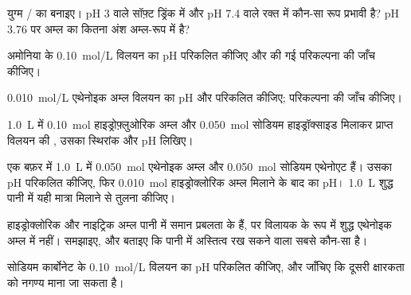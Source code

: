 \begin{exercise}[$\star$]\label{exo:b1:predominant-reaction:4}
युग्म / का  बनाइए।
pH 3 वाले सॉफ़्ट ड्रिंक में और pH 7.4 वाले रक्त में कौन-सा रूप प्रभावी है?
pH 3.76 पर अम्ल का कितना अंश अम्ल-रूप में है?
\end{exercise}

\begin{exercise}[$\star\star$]\label{exo:b1:predominant-reaction:5}
अमोनिया के \qty{0.10}{mol/L} विलयन का pH परिकलित कीजिए और की गई
परिकल्पना की जाँच कीजिए।
\end{exercise}

\begin{exercise}[$\star\star$]\label{exo:b1:predominant-reaction:6}
\qty{0.010}{mol/L} एथेनोइक अम्ल विलयन का pH और
 परिकलित कीजिए; परिकल्पना की जाँच कीजिए।
\end{exercise}

\begin{exercise}[$\star\star$]\label{exo:b1:predominant-reaction:7}
\qty{1.0}{L} में \qty{0.10}{mol} हाइड्रोफ़्लुओरिक अम्ल
और \qty{0.050}{mol} सोडियम हाइड्रॉक्साइड मिलाकर प्राप्त विलयन की , उसका स्थिरांक
और pH लिखिए।
\end{exercise}

\begin{exercise}[$\star\star$]\label{exo:b1:predominant-reaction:8}
एक बफ़र में \qty{1.0}{L} में \qty{0.050}{mol} एथेनोइक अम्ल और \qty{0.050}{mol}
सोडियम एथेनोएट हैं। उसका pH परिकलित कीजिए, फिर
\qty{0.010}{mol} हाइड्रोक्लोरिक अम्ल मिलाने के बाद का pH। \qty{1.0}{L} शुद्ध पानी में
यही मात्रा मिलाने से तुलना कीजिए।
\end{exercise}

\begin{exercise}[$\star\star$]\label{exo:b1:predominant-reaction:9}
हाइड्रोक्लोरिक और नाइट्रिक अम्ल पानी में समान प्रबलता के हैं, पर
विलायक के रूप में शुद्ध एथेनोइक अम्ल में नहीं। समझाइए, और बताइए कि पानी में
अस्तित्व रख सकने वाला सबसे  कौन-सा है।
\end{exercise}

\begin{exercise}[$\star\star\star$]\label{exo:b1:predominant-reaction:10}
सोडियम कार्बोनेट के \qty{0.10}{mol/L} विलयन का pH परिकलित कीजिए, और
जाँचिए कि दूसरी क्षारकता को नगण्य माना जा सकता है।
\end{exercise}

